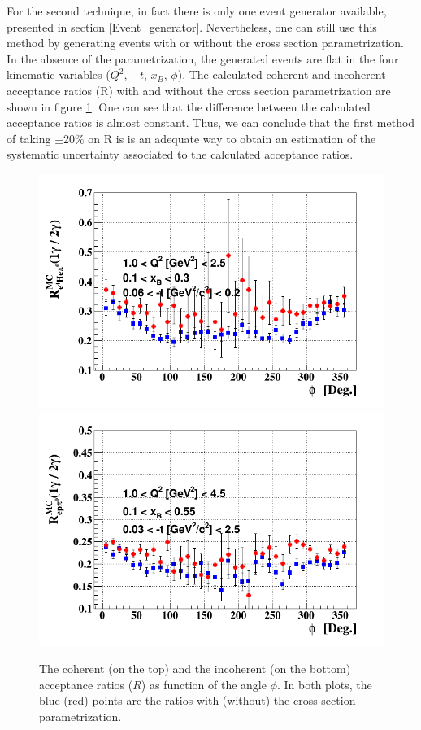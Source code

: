 For the second technique, in fact there is only one event generator available, presented in section \ref{Event_generator}. Nevertheless, one can still use this method by generating events with or without the cross section parametrization. In the absence of the parametrization, the generated events are flat in the four kinematic variables ($Q^2$, $-t$, $x_B$, $\phi$). The calculated coherent and incoherent acceptance ratios (R) with and without the cross section parametrization are shown in figure \ref{fig:accep_ratio_sys_uncer}. One can see that the difference between the calculated acceptance ratios is almost constant. Thus, we can conclude that the first method of taking $\pm$20$\%$ on R is is an adequate way to obtain an estimation of the systematic uncertainty associated to the calculated acceptance ratios.
\begin{figure}[h!]
\includegraphics[scale=0.34]{fig_results/coh_accp_ratio_phi.png}
\includegraphics[scale=0.34]{fig_results/incoh_accp_ratio_phi.png}
\caption{The coherent (on the top) and the incoherent (on the bottom) acceptance ratios ($R$) as function of the angle $\phi$. In both plots, the blue (red) points are the ratios with (without) the cross section parametrization.} 
\label{fig:accep_ratio_sys_uncer}
\end{figure}

